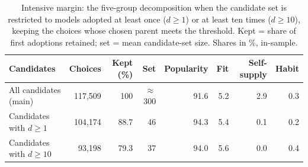 \begin{table}[htbp]
\centering
\caption{Intensive margin: the five-group decomposition when the candidate set is restricted to models adopted at least once ($d \ge 1$) or at least ten times ($d \ge 10$), keeping the choices whose chosen parent meets the threshold. Kept = share of first adoptions retained; set = mean candidate-set size. Shares in \%, in-sample.}
\label{tab:margin}
\small
\begin{tabular}{lrrrrrrr}
\toprule
Candidates & Choices & Kept (\%) & Set & Popularity & Fit & Self-supply & Habit \\
\midrule
All candidates (main) & 117,509 & 100 & $\approx$300 & 91.6 & 5.2 & 2.9 & 0.3 \\
Candidates with $d \ge 1$ & 104,174 & 88.7 & 46 & 94.3 & 5.4 & 0.1 & 0.2 \\
Candidates with $d \ge 10$ & 93,198 & 79.3 & 37 & 94.0 & 5.6 & 0.0 & 0.4 \\
\bottomrule
\end{tabular}
\end{table}
